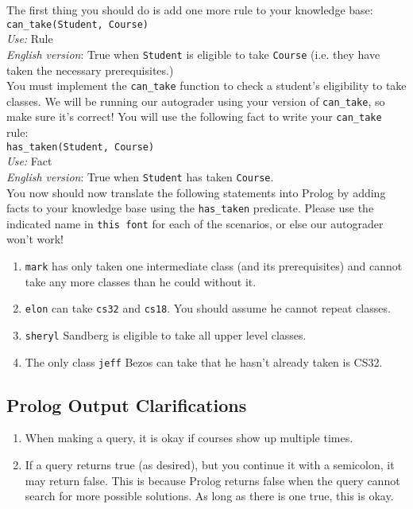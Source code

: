 \documentclass{article}
\begin{document}
The first thing you should do is add one more rule to your knowledge base:\\

\verb|can_take(Student, Course)|\\
\textit{Use:} Rule\\
\textit{English version}: True when \verb|Student| is eligible to take \verb|Course| (i.e. they have taken the necessary prerequisites.)\\ 

You must implement the \verb|can_take| function to check a student’s eligibility to take classes. We will be running our autograder using your version of \verb|can_take|, so make sure it's correct! You will use the following fact to write your \verb|can_take| rule: \\

\verb|has_taken(Student, Course)|\\
\textit{Use:} Fact\\
\textit{English version}: True when \verb|Student| has taken \verb|Course|. \\

 You now should now translate the following statements into Prolog by adding facts to your knowledge base using the \verb|has_taken| predicate. Please use the indicated name in \verb|this font| for each of the scenarios, or else our autograder won't work!

\begin{enumerate}
    \item \verb|mark| has only taken one intermediate class (and its prerequisites) and cannot take any more classes than he could without it.
    \item \verb|elon| can take \verb|cs32| and \verb|cs18|. You should assume he cannot repeat classes.
    \item \verb|sheryl| Sandberg is eligible to take all upper level classes. 
    \item The only class \verb|jeff| Bezos can take that he hasn't already taken is CS32.\\
\end{enumerate}

\subsection{Prolog Output Clarifications}
\begin{enumerate}
    \item When making a query, it is okay if courses show up multiple times.
    \item If a query returns true (as desired), but you continue it with a semicolon, it may return false. This is because Prolog returns false when the query cannot search for more possible solutions. As long as there is one true, this is okay.
\end{enumerate}
\end{document}
